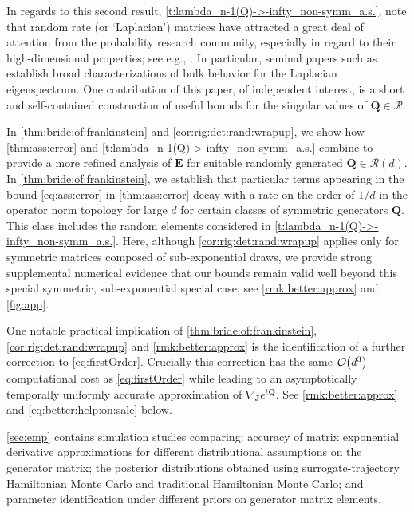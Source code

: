 \documentclass[9pt,twocolumn,twoside]{pnas-new}
\newcommand{\order}[1]{{\cal O}\hspace{-0.2em}\left( #1 \right)}
\newcommand{\?}{\textbf{?}}
\newcommand{\E}{{\mathbf{ E}}}
\newcommand{\QQ}{\mathbf{Q}}
\newcommand{\JJ}{\mathbf{J}}
\begin{document}
In regards to this second result,
\cref{t:lambda_n-1(Q)->-infty_non-symm_a.s.}, note that random rate (or
`Laplacian') matrices have attracted a great deal of attention from the
probability research community, especially in regard to their
high-dimensional properties; see e.g., \cite{takahashi:1969,bai:1999,
  chafai:2010, bordenave:caputo:chafai:2012, chatterjee:hazra:2022,
  nakerst:denisov:haque:2023}. In particular, seminal papers such as
\cite{bryc:dembo:jiang:2006, ding:jiang:2010,
  bordenave:caputo:chafai:2014} establish broad characterizations of
bulk behavior for the Laplacian eigenspectrum.  One contribution of
this paper, of independent interest, is a short and self-contained
construction of useful bounds for the singular values of
$\QQ \in \mathcal{R}$.

In \cref{thm:bride:of:frankinstein} and
\cref{cor:rig:det:rand:wrapup}, we show how \cref{thm:ass:error} and
\cref{t:lambda_n-1(Q)->-infty_non-symm_a.s.} combine to provide a more
refined analysis of $\E$ for suitable randomly generated
$\QQ \in \mathcal{R}(d)$. In \cref{thm:bride:of:frankinstein}, we
establish that particular terms appearing in the bound
\eqref{eq:ass:error} in \cref{thm:ass:error} decay with a rate on the
order of $1/d$ in the operator norm topology for large $d$ for certain
classes of symmetric generators $\QQ$. This class includes the random
elements considered in \cref{t:lambda_n-1(Q)->-infty_non-symm_a.s.}.
Here, although \cref{cor:rig:det:rand:wrapup} applies only for
symmetric matrices composed of sub-exponential draws, we provide
strong supplemental numerical evidence that our bounds remain valid
well beyond this special symmetric, sub-exponential special case; see
\cref{rmk:better:approx} and \cref{fig:app}.

One notable practical implication of \cref{thm:bride:of:frankinstein},
\cref{cor:rig:det:rand:wrapup} and \cref{rmk:better:approx} is the
identification of a further correction to
\eqref{eq:firstOrder}. Crucially this correction has the same
$\order{d^3}$ computational cost as \eqref{eq:firstOrder} while
leading to an asymptotically temporally uniformly accurate
approximation of $\nabla_{\JJ} e^{t \QQ}$.  See
\cref{rmk:better:approx} and \eqref{eq:better:help:on:sale} below.

 \cref{sec:emp} contains simulation studies comparing: accuracy of matrix exponential derivative approximations for different distributional assumptions on the generator matrix; the posterior distributions obtained using surrogate-trajectory Hamiltonian Monte Carlo and traditional Hamiltonian Monte Carlo; and parameter identification under different priors on generator matrix elements.
\end{document}

